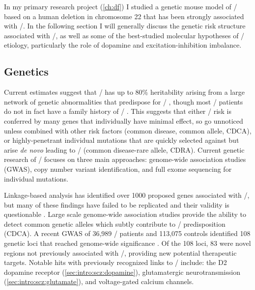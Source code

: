 In my primary research project (\autoref{ch:df}) I studied a genetic mouse model of \scz/ based on a human deletion in chromosome 22 that has been strongly associated with \scz/. In the following section I will generally discuss the genetic risk structure associated with \scz/, as well as some of the best-studied molecular hypotheses of \scz/ etiology, particularly the role of dopamine and excitation-inhibition imbalance.

\subsection{Genetics}
Current estimates suggest that \scz/ has up to 80\% heritability arising from a large network of genetic abnormalities that predispose for \scz/ \citep{Ripke2011, Tandon2008}, though most \scz/ patients do not in fact have a family history of \scz/ \citep{Tandon2008, Rodriguez-Murillo2012}.
This suggests that either \scz/ risk is conferred by many genes that individually have minimal effect, so go unnoticed unless combined with other risk factors (common disease, common allele, CDCA), or highly-penetrant individual mutations that are quickly selected against but arise \emph{de novo} leading to \scz/ (common disease-rare allele, CDRA).
Current genetic research of \scz/ focuses on three main approaches: genome-wide association studies (GWAS), copy number variant identification, and full exome sequencing for individual mutations.

Linkage-based analysis has identified over 1000 proposed genes associated with \scz/, but many of these findings have failed to be replicated and their validity is questionable \citep[\url{http://www.szgene.org},][]{Allen2008}.
Large scale genome-wide association studies provide the ability to detect common genetic alleles which subtly contribute to \scz/ predisposition (CDCA).
A recent GWAS of 36,989 \scz/ patients and 113,075 controls identified 108 genetic loci that reached genome-wide significance \citep{Ripke2014}.
Of the 108 loci, 83 were novel regions not previously associated with \scz/, providing new potential therapeutic targets.
Notable hits with previously recognized links to \scz/ include: the D2 dopamine receptor (\autoref{sec:intro:scz:dopamine}), glutamatergic neurotransmission (\autoref{sec:intro:scz:glutamate}), and voltage-gated calcium channels.

